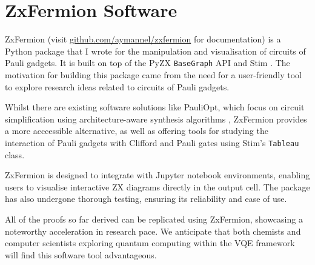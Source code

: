 \chapter{ZxFermion Software}

ZxFermion (visit \href{https://github.com/aymannel/zxfermion}{github.com/aymannel/zxfermion} for documentation) is a Python package that I wrote for the manipulation and visualisation of circuits of Pauli gadgets. It is built on top of the PyZX \lstinline{BaseGraph} API \cite{Kissinger2020} and Stim \cite{Gidney2021}. The motivation for building this package came from the need for a user-friendly tool to explore research ideas related to circuits of Pauli gadgets.

Whilst there are existing software solutions like PauliOpt, which focus on circuit simplification using architecture-aware synthesis algorithms \cite{Gogioso2023}, ZxFermion provides a more acccessible alternative, as well as offering tools for studying the interaction of Pauli gadgets with Clifford and Pauli gates using Stim's \lstinline{Tableau} class.

ZxFermion is designed to integrate with Jupyter notebook environments, enabling users to visualise interactive ZX diagrams directly in the output cell. The package has also undergone thorough testing, ensuring its reliability and ease of use.

All of the proofs so far derived can be replicated using ZxFermion, showcasing a noteworthy acceleration in research pace. We anticipate that both chemists and computer scientists exploring quantum computing within the VQE framework will find this software tool advantageous.
